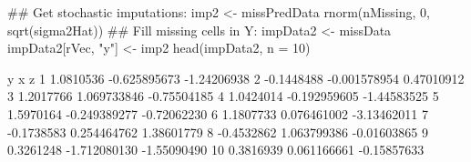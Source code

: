 \begin{Schunk}
\begin{Sinput}
 ## Get stochastic imputations:
 imp2 <- missPredData %*% betaHat + 
   rnorm(nMissing, 0, sqrt(sigma2Hat))
 ## Fill missing cells in Y:
 impData2 <- missData
 impData2[rVec, "y"] <- imp2
 head(impData2, n = 10)
\end{Sinput}
\begin{Soutput}
            y            x           z
1   1.0810536 -0.625895673 -1.24206938
2  -0.1448488 -0.001578954  0.47010912
3   1.2017766  1.069733846 -0.75504185
4   1.0424014 -0.192959605 -1.44583525
5   1.5970164 -0.249389277 -0.72062230
6   1.1807733  0.076461002 -3.13462011
7  -0.1738583  0.254464762  1.38601779
8  -0.4532862  1.063799386 -0.01603865
9   0.3261248 -1.712080130 -1.55090490
10  0.3816939  0.061166661 -0.15857633
\end{Soutput}
\end{Schunk}
